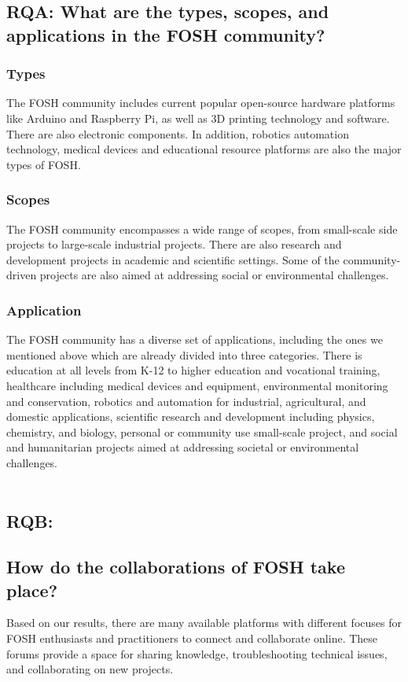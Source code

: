 \documentclass[final-report.tex]{subfiles}
\begin{document}
\subsection{RQA: What are the types, scopes, and applications in the FOSH community?}

\subsubsection{Types} 
The FOSH community includes current popular open-source hardware platforms like Arduino and Raspberry Pi, as well as 3D printing technology and software. There are also electronic components. In addition, robotics automation technology, medical devices and educational resource platforms are also the major types of FOSH.

\subsubsection{Scopes}
The FOSH community encompasses a wide range of scopes, from small-scale side projects to large-scale industrial projects. There are also research and development projects in academic and scientific settings. Some of the community-driven projects are also aimed at addressing social or environmental challenges.

\subsubsection{Application}
The FOSH community has a diverse set of applications, including the ones we mentioned above which are already divided into three categories. There is education at all levels from K-12 to higher education and vocational training, healthcare including medical devices and equipment, environmental monitoring and conservation, robotics and automation for industrial, agricultural, and domestic applications, scientific research and development including physics, chemistry, and biology, personal or community use small-scale project, and social and humanitarian projects aimed at addressing societal or environmental challenges.
\\\\
\subsection{RQB: }

\subsection{How do the collaborations of FOSH take place?}
Based on our results, there are many available platforms with different focuses for FOSH enthusiasts and practitioners to connect and collaborate online. These forums provide a space for sharing knowledge, troubleshooting technical issues, and collaborating on new projects.
\end{document}
